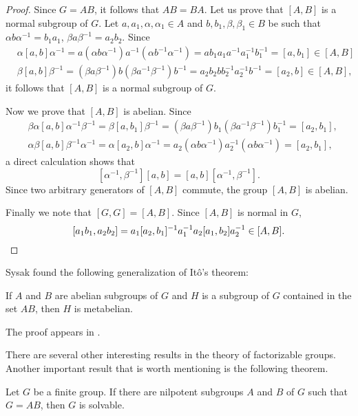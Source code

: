 \begin{proof}
	Since $G=AB$, it follows that $AB=BA$. Let us prove that $[A,B]$ is a normal 
	subgroup of $G$. Let $a,a_1,\alpha,\alpha_1\in A$ and $b,b_1,\beta,\beta_1\in B$ 
	be such that $\alpha b\alpha^{-1}=b_1a_1$, $\beta
	a\beta^{-1}=a_2b_2$. Since 
	\begin{align*}
		&\alpha[a,b]\alpha^{-1}=a(\alpha b\alpha^{-1})a^{-1}(\alpha b^{-1}\alpha^{-1})=ab_1a_1a^{-1}a_1^{-1}b_1^{-1}=[a,b_1]\in [A,B]\\
		&\beta[a,b]\beta^{-1}=(\beta a\beta^{-1})b(\beta a^{-1}\beta^{-1})b^{-1}=a_2b_2bb_2^{-1}a_2^{-1}b^{-1}=[a_2,b]\in [A,B],
	\end{align*}
	it follows that $[A,B]$ is a normal subgroup of $G$. 

	Now we prove that $[A,B]$ is abelian. Since  
	\begin{align*}
		&\beta\alpha[a,b]\alpha^{-1}\beta^{-1} = \beta[a,b_1]\beta^{-1}=(\beta a\beta^{-1})b_1(\beta a^{-1}\beta^{-1})b_1^{-1}=[a_2,b_1],\\
		&\alpha\beta[a,b]\beta^{-1}\alpha^{-1} = \alpha[a_2,b]\alpha^{-1}=a_2(\alpha b\alpha^{-1})a_2^{-1}(\alpha b\alpha^{-1})=[a_2,b_1],
	\end{align*}
	a direct calculation shows that  
	\[
		[\alpha^{-1},\beta^{-1}][a,b]=[a,b][\alpha^{-1},\beta^{-1}].
	\]
	Since two arbitrary generators of $[A,B]$ commute, the group $[A,B]$ is abelian.
	
	Finally we note that $[G,G]=[A,B]$. Since $[A,B]$ is normal in $G$,  
	\[
	[a_1b_1,a_2b_2]=a_1[a_2,b_1]^{-1}a_1^{-1}a_2[a_1,b_2]a_2^{-1}\in [A,B].\qedhere 
	\]
\end{proof}


Sysak found the following generalization of It\^o's theorem:

\begin{theorem}[Sysak]
If $A$ and $B$ are abelian subgroups of $G$ and
$H$ is a subgroup of $G$ contained in the set $AB$, then
$H$ is metabelian. 
\end{theorem}

The proof appears in \cite{MR988177}.  

There are several other interesting results in the theory of factorizable groups. 
Another important result that is worth mentioning is the following
theorem. 

\begin{theorem}
Let $G$ be a finite group. If there are nilpotent subgroups $A$ and $B$ of $G$ such that 
$G=AB$, then $G$ is solvable. 
\end{theorem}

